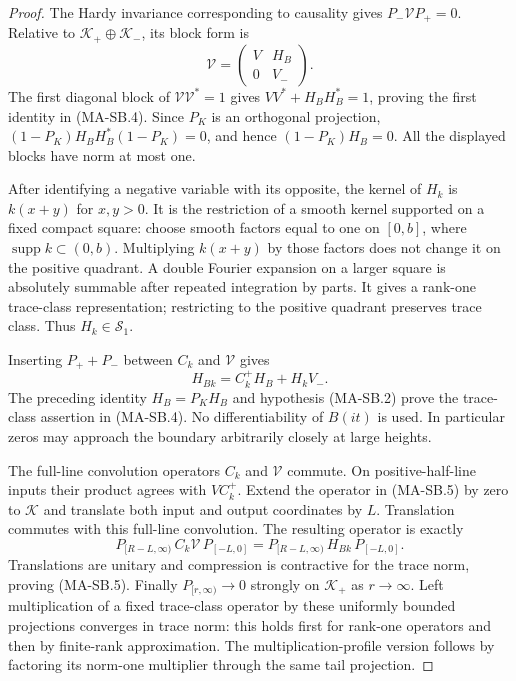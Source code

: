 \begin{proof}
The Hardy invariance corresponding to causality gives
$P_-\mathcal VP_+=0$.  Relative to
$\mathcal K_+\oplus\mathcal K_-$, its block form is
\[
                      \mathcal V=
                       \begin{pmatrix}V&H_B\\0&V_-\end{pmatrix}.
 \tag{MA-SB.6}
\]
The first diagonal block of $\mathcal V\mathcal V^*=1$
gives $VV^*+H_BH_B^*=1$, proving the first identity
in (MA-SB.4).
Since $P_K$ is an orthogonal projection,
$(1-P_K)H_BH_B^*(1-P_K)=0$, and hence
$(1-P_K)H_B=0$.
All the displayed blocks have norm at most one.

After identifying a negative variable with its opposite,
the kernel of $H_k$ is $k(x+y)$ for $x,y>0$.
It is the restriction of a smooth kernel supported on
a fixed compact square: choose smooth factors equal to
one on $[0,b]$, where $\operatorname{supp}k\subset(0,b)$.
Multiplying $k(x+y)$ by those factors does not change it
on the positive quadrant.
A double Fourier expansion on a larger square is
absolutely summable after repeated integration by parts.
It gives a rank-one trace-class representation; restricting
to the positive quadrant preserves trace class.
Thus $H_k\in\mathcal S_1$.

Inserting $P_++P_-$ between $C_k$ and $\mathcal V$ gives
\[
                      H_{Bk}=C_k^+H_B+H_kV_- .
 \tag{MA-SB.7}
\]
The preceding identity $H_B=P_KH_B$ and hypothesis
(MA-SB.2) prove the trace-class assertion in (MA-SB.4).
No differentiability of $B(it)$ is used.
In particular zeros may approach the boundary arbitrarily
closely at large heights.

The full-line convolution operators $C_k$ and
$\mathcal V$ commute.  On positive-half-line inputs their
product agrees with $VC_k^+$.
Extend the operator in (MA-SB.5) by zero to $\mathcal K$
and translate both input and output coordinates by $L$.
Translation commutes with this full-line convolution.
The resulting operator is exactly
\[
        P_{[R-L,\infty)}\,C_k\mathcal V\,P_{[-L,0]}
       =P_{[R-L,\infty)}\,H_{Bk}\,P_{[-L,0]} .
 \tag{MA-SB.8}
\]
Translations are unitary and compression is contractive
for the trace norm, proving (MA-SB.5).
Finally $P_{[r,\infty)}\to0$ strongly on $\mathcal K_+$
as $r\to\infty$.
Left multiplication of a fixed trace-class operator
by these uniformly bounded projections converges in
trace norm: this holds first for rank-one operators
and then by finite-rank approximation.
The multiplication-profile version follows by factoring
its norm-one multiplier through the same tail projection.
\end{proof}

